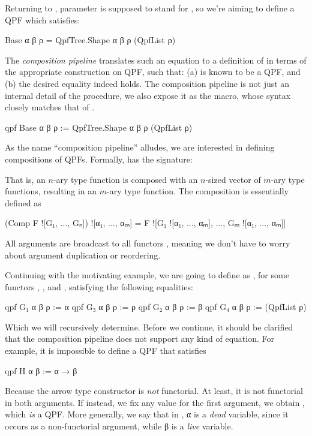 Returning to , parameter  is supposed to stand for , so we're aiming to define a QPF  which satisfies:
\begin{leancode}
  Base α β ρ = QpfTree.Shape α β ρ (QpfList ρ)
\end{leancode}


The \emph{composition pipeline} translates such an equation to a definition of  in terms of the appropriate construction on QPF, such that: (a)  is known to be a QPF, and (b) the desired equality indeed holds.
The composition pipeline is not just an internal detail of the procedure, we also expose it as the \qpf{} macro, whose syntax closely matches that of .
\begin{leancode}
  qpf Base α β ρ := QpfTree.Shape α β ρ (QpfList ρ)
\end{leancode}



As the name ``composition pipeline'' alludes, we are interested in defining compositions of QPFs. Formally,  has the signature:
\begin{center}
\end{center}
That is, an $n$-ary type function  is composed with an $n$-sized vector of $m$-ary type functions, resulting in an $m$-ary type function. The composition is essentially defined as
\begin{leancode}
    (Comp F ![G₁, ..., Gₙ]) ![α₁, ..., αₘ] 
                = F ![G₁ ![α₁, ..., αₘ], ..., Gₘ ![α₁, ..., αₘ]]
\end{leancode}
All arguments  are broadcast to all functors , meaning we don't have to worry about argument duplication or reordering.

Continuing with the motivating example, we are going to define  as , for some functors , ,  and , satisfying the following equalities:
\begin{leancode}
  qpf G₁ α β ρ := α                qpf G₃ α β ρ := ρ
  qpf G₂ α β ρ := β                qpf G₄ α β ρ := (QpfList ρ)
\end{leancode}

Which we will recursively determine.
Before we continue, it should be clarified that the composition pipeline does not support any kind
of equation. For example, it is impossible to define a QPF that satisfies
\begin{badleancode}
  qpf H α β := α → β 
\end{badleancode}
Because the arrow type constructor  is \emph{not} functorial. 
At least, it is not functorial in both arguments. If instead, we fix any value  for the
first argument, we obtain , which \emph{is} a QPF.
More generally, we say that in , α is a \emph{dead} variable, since it occurs as a non-functorial argument, while β is a \emph{live} variable.

